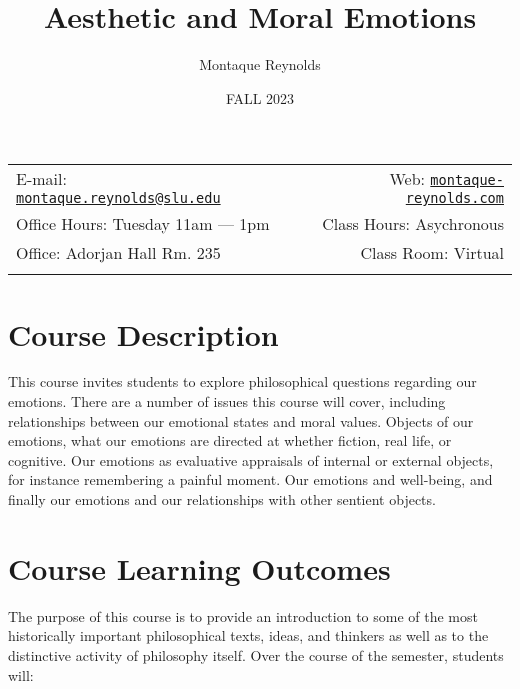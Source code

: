 \documentclass[11pt,]{article}
\title{Aesthetic and Moral Emotions}
\author{Montaque Reynolds}
\date{FALL 2023}
\begin{document}
		\maketitle
	

		\thispagestyle{firststyle}



	\noindent \begin{tabular*}{\textwidth}{ @{\extracolsep{\fill}} lr @{\extracolsep{\fill}}}


E-mail: \texttt{\href{mailto:montaque.reynolds@slu.edu}{\nolinkurl{montaque.reynolds@slu.edu}}} & Web: \href{http://montaque-reynolds.com}{\tt montaque-reynolds.com}\\
Office Hours: Tuesday 11am --- 1pm  &  Class Hours: Asychronous\\
Office: Adorjan Hall Rm. 235  & Class Room: Virtual\\
	&  \\
	\hline
	\end{tabular*}

\vspace{2mm}



\section{Course Description}\label{course-description}

This course invites students to explore philosophical questions
regarding our emotions. There are a number of issues this course will
cover, including relationships between our emotional states and moral
values. Objects of our emotions, what our emotions are directed at
whether fiction, real life, or cognitive. Our emotions as evaluative
appraisals of internal or external objects, for instance remembering a
painful moment. Our emotions and well-being, and finally our emotions
and our relationships with other sentient objects.

\section{Course Learning Outcomes}\label{course-learning-outcomes}

The purpose of this course is to provide an introduction to some of the
most historically important philosophical texts, ideas, and thinkers as
well as to the distinctive activity of philosophy itself. Over the
course of the semester, students will:
\end{document}
